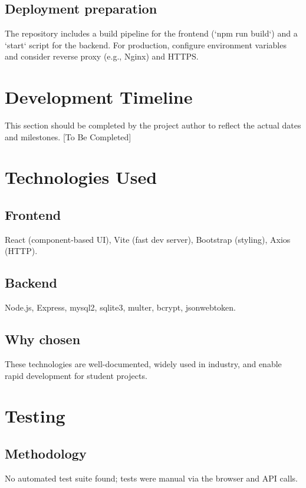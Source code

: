 \documentclass[12pt,a4paper]{report}
\begin{document}
\section{Deployment preparation}
The repository includes a build pipeline for the frontend (`npm run build`) and a `start` script for the backend. For production, configure environment variables and consider reverse proxy (e.g., Nginx) and HTTPS.

\clearpage

\chapter{Development Timeline}
This section should be completed by the project author to reflect the actual dates and milestones. [To Be Completed]

\clearpage

\chapter{Technologies Used}
\section{Frontend}
React (component-based UI), Vite (fast dev server), Bootstrap (styling), Axios (HTTP).

\section{Backend}
Node.js, Express, mysql2, sqlite3, multer, bcrypt, jsonwebtoken.

\section{Why chosen}
These technologies are well-documented, widely used in industry, and enable rapid development for student projects.

\clearpage

\chapter{Testing}
\section{Methodology}
No automated test suite found; tests were manual via the browser and API calls.
\end{document}

